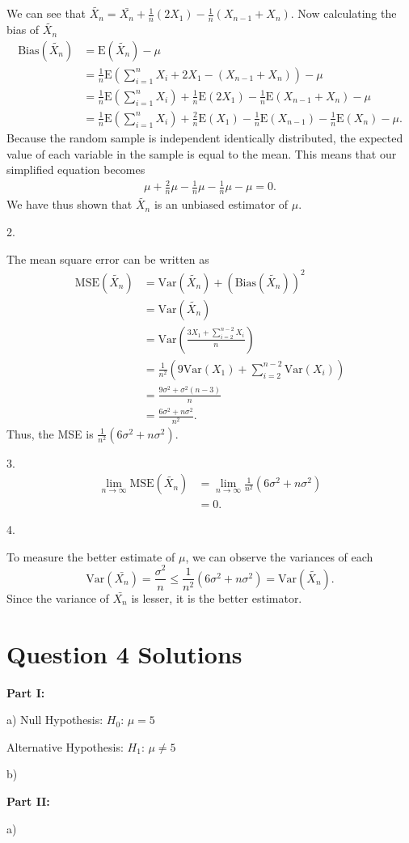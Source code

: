 \documentclass{article}
\begin{document}
We can see that $\tilde{X_n} = \bar{X_n} + \frac{1}{n}(2X_1)-\frac{1}{n}\left(X_{n-1}+X_n\right)$. Now calculating the bias of $\tilde{X_n}$
\begin{align*}
    \mbox{Bias}(\tilde{X_n}) &=\mbox{E}(\tilde{X_n}) - \mu\\
    &= \frac{1}{n}\mbox{E}\left(\sum_{i = 1}^{n}X_i + 2X_1 - (X_{n-1}+X_n)\right) - \mu\\
    &= \frac{1}{n}\mbox{E}\left(\sum_{i = 1}^{n}X_i\right)+\frac{1}{n}\mbox{E}(2X_1)-\frac{1}{n}\mbox{E}(X_{n-1}+X_n) - \mu\\
    &= \frac{1}{n}\mbox{E}\left(\sum_{i = 1}^{n}X_i\right)+\frac{2}{n}\mbox{E}(X_1)-\frac{1}{n}\mbox{E}(X_{n-1})-\frac{1}{n}\mbox{E}(X_n) - \mu\mbox{.}
\end{align*}
\hspace*{6mm}Because the random sample is independent identically distributed, the expected value of each variable in the sample is equal to the mean. This means that our simplified equation becomes
\begin{align*}
    \mu + \frac{2}{n}\mu -\frac{1}{n}\mu -\frac{1}{n}\mu -\mu = 0\mbox{.}
\end{align*}
We have thus shown that $\tilde{X_n}$ is an unbiased estimator of $\mu$.

2.

The mean square error can be written as
\begin{align*}
    \mbox{MSE}(\tilde{X_n}) &= \mbox{Var}(\tilde{X_n})+(\mbox{Bias}(\tilde{X_n}))^2\\
    &= \mbox{Var}(\tilde{X_n})\\
    &= \mbox{Var}\left(\frac{3X_1+\sum_{i = 2}^{n-2}X_i}{n}\right)\\
    &= \frac{1}{n^2}\left(9\mbox{Var}(X_1) + \sum_{i = 2}^{n-2}\mbox{Var}(X_i)\right)\\
    &= \frac{9\sigma^2 + \sigma^2(n - 3)}{n}\\
    &= \frac{6\sigma^2 + n\sigma^2}{n^2}\mbox{.}
\end{align*}
Thus, the MSE is $\frac{1}{n^2}(6\sigma^2 + n\sigma^2)$.

3.
\begin{align*}
    \lim_{n\rightarrow\infty}\mbox{MSE}(\tilde{X_n}) &= \lim_{n\rightarrow\infty}\frac{1}{n^2}(6\sigma^2 + n\sigma^2)\\
    &= 0\mbox{.}
\end{align*}

4.

To measure the better estimate of $\mu$, we can observe the variances of each
\begin{equation*}
    \mbox{Var}(\bar{X_n}) = \frac{\sigma^2}{n}\leq \frac{1}{n^2}(6\sigma^2 + n\sigma^2) = \mbox{Var}(\tilde{X_n})\mbox{.}
\end{equation*}
Since the variance of $\bar{X_n}$ is lesser, it is the better estimator.

\section*{Question 4 Solutions} %
\textbf{Part I:}

a)
Null Hypothesis: $H_0\mbox{: }\mu = 5$

Alternative Hypothesis: $H_1\mbox{: }\mu \neq 5$

b)

\textbf{Part II:}

a)
\end{document}
